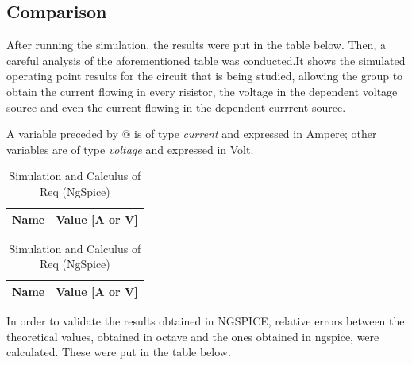 \subsection{Comparison}
After running the simulation, the results were put in the table below. Then, a careful analysis of the aforementioned table was conducted.It shows the simulated operating point results for the circuit that is being studied, allowing the group to obtain the current flowing in every risistor, the voltage in the dependent voltage source and even the current flowing in the dependent currrent source. 

A variable preceded by @ is of type {\em current} and expressed in Ampere; other variables are of type {\it voltage} and expressed in
    Volt.
\begin{table}[ht]
\parbox{.45\linewidth}{
  \centering
  \begin{tabular}{|l|r|}
    \hline    
    {\bf Name} & {\bf Value [A or V]} \\ \hline
    
  \end{tabular}
  \caption{Simulation and Calculus of Req (NgSpice)}}
 
\parbox{.45\linewidth}{
  \centering
  \begin{tabular}{|l|r|}
    \hline    
    {\bf Name} & {\bf Value [A or V]} \\ \hline
    
  \end{tabular}
  \caption{Simulation and Calculus of Req (NgSpice)}}
 
\end{table}


In order to validate the results obtained in NGSPICE, relative errors between the theoretical values, obtained in octave and the ones obtained in ngspice, were calculated. These were put in the table below.

